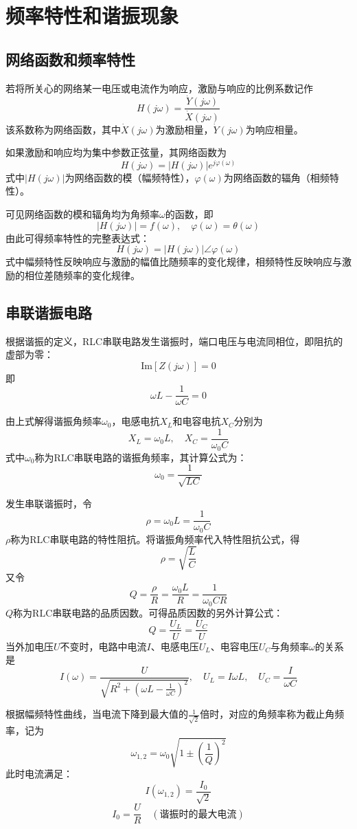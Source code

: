 \chapter{频率特性和谐振现象}

\section{网络函数和频率特性}
若将所关心的网络某一电压或电流作为响应，激励与响应的比例系数记作
\[
H(j\omega) = \frac{\dot{Y}(j\omega)}{\dot{X}(j\omega)}
\]
该系数称为网络函数，其中$\dot{X}(j\omega)$为激励相量，$\dot{Y}(j\omega)$为响应相量。

如果激励和响应均为集中参数正弦量，其网络函数为
\[
H(j\omega) = |H(j\omega)|e^{j\varphi(\omega)}
\]
式中$|H(j\omega)|$为网络函数的模（幅频特性），$\varphi(\omega)$为网络函数的辐角（相频特性）。

可见网络函数的模和辐角均为角频率$\omega$的函数，即
\[
|H(j\omega)| = f(\omega), \quad \varphi(\omega) = \theta(\omega)
\]
由此可得频率特性的完整表达式：
\[
H(j\omega) = |H(j\omega)|\angle\varphi(\omega)
\]
式中幅频特性反映响应与激励的幅值比随频率的变化规律，相频特性反映响应与激励的相位差随频率的变化规律。

\section{串联谐振电路}
根据谐振的定义，RLC串联电路发生谐振时，端口电压与电流同相位，即阻抗的虚部为零：
\[
\mathrm{Im}[Z(j\omega)] = 0
\]
即
\[
\omega L - \frac{1}{\omega C} = 0
\]

由上式解得谐振角频率$\omega_0$，电感电抗$X_L$和电容电抗$X_C$分别为
\[
X_L = \omega_0 L, \quad X_C = \frac{1}{\omega_0 C}
\]
式中$\omega_0$称为$\mathrm{RLC}$串联电路的谐振角频率，其计算公式为：
\[
\omega_0 = \frac{1}{\sqrt{LC}}
\]

发生串联谐振时，令
\[
\rho = \omega_0 L = \frac{1}{\omega_0 C}
\]
$\rho$称为$\mathrm{RLC}$串联电路的特性阻抗。将谐振角频率代入特性阻抗公式，得
\[
\rho = \sqrt{\frac{L}{C}}
\]
又令
\[
Q = \frac{\rho}{R} = \frac{\omega_0 L}{R} = \frac{1}{\omega_0 CR}
\]
$Q$称为$\mathrm{RLC}$串联电路的品质因数。可得品质因数的另外计算公式：
\[
Q = \frac{U_L}{U} = \frac{U_C}{U}
\]
当外加电压$U$不变时，电路中电流$I$、电感电压$U_L$、电容电压$U_C$与角频率$\omega$的关系是
\[
I(\omega) = \frac{U}{\sqrt{R^2 + \left(\omega L - \frac{1}{\omega C}\right)^2}}, \quad U_L = I\omega L, \quad U_C = \frac{I}{\omega C}
\]

根据幅频特性曲线，当电流下降到最大值的$\frac{1}{\sqrt{2}}$倍时，对应的角频率称为截止角频率，记为
\[
\omega_{1,2} = \omega_0 \sqrt{1 \pm \left(\frac{1}{Q}\right)^2}
\]
此时电流满足：
\[
I(\omega_{1,2}) = \frac{I_0}{\sqrt{2}}
\]
\[
I_0 = \frac{U}{R} \quad (\text{谐振时的最大电流})
\]

